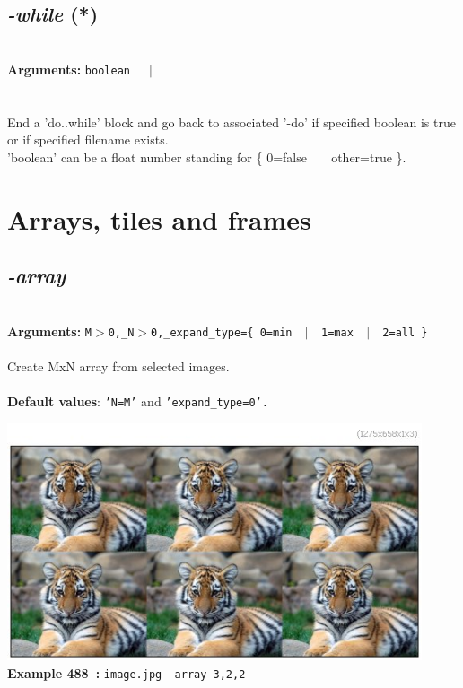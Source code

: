 \documentclass[a4paper,11pt,twoside]{book}
\begin{document}
\subsection{\emph{-while} (*)}\vspace*{-0.5em}
~\\\textbf{Arguments: } 
{\small \texttt{boolean}}~~~$|$\\
\\~\\
End a 'do..while' block and go back to associated '-do'
if specified boolean is true or if specified filename exists.
~\\'boolean' can be a float number standing for \{ 0=false ~$|$~ other=true \}.

\section{Arrays, tiles and frames}


\subsection{\emph{-array} }\vspace*{-0.5em}
~\\\textbf{Arguments: } 
{\small \texttt{M$>$0,\_N$>$0,\_expand\_type=\{ 0=min ~$|$~ 1=max ~$|$~ 2=all \}}}\\~\\
Create MxN array from selected images.
~\\~\\\textbf{Default values}: {\small \texttt{'N=M'} and \texttt{'expand\_type=0'.}}
\begin{center}\includegraphics[keepaspectratio=true,height=7cm,width=\textwidth]{img/gmic_def488.jpg}\\
{\footnotesize \textbf{Example 488~:} \texttt{image.jpg -array 3,2,2}}
\end{center}
\end{document}
